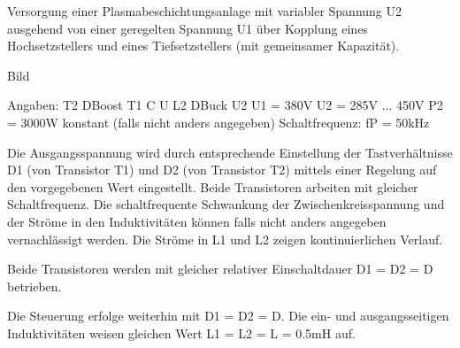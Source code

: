 

Versorgung einer Plasmabeschichtungsanlage mit variabler Spannung U2 ausgehend von einer
geregelten Spannung U1 über Kopplung eines Hochsetzstellers und eines Tiefsetzstellers (mit
gemeinsamer Kapazität).


Bild


Angaben:
T2
DBoost
T1
C
U
L2
DBuck
U2
U1 = 380V
U2 = 285V ... 450V
P2 = 3000W konstant (falls nicht anders angegeben)
Schaltfrequenz: fP = 50kHz


Die Ausgangsspannung wird durch entsprechende Einstellung der Tastverhältnisse D1 (von Transistor
T1) und D2 (von Transistor T2) mittels einer Regelung auf den vorgegebenen Wert eingestellt. Beide
Transistoren arbeiten mit gleicher Schaltfrequenz. Die schaltfrequente Schwankung der
Zwischenkreisspannung und der Ströme in den Induktivitäten können falls nicht anders
angegeben vernachlässigt werden. Die Ströme in L1 und L2 zeigen kontinuierlichen Verlauf.

Beide Transistoren werden mit gleicher relativer Einschaltdauer D1 = D2 = D betrieben.





Die Steuerung erfolge weiterhin mit D1 = D2 = D. Die ein- und ausgangsseitigen Induktivitäten
weisen gleichen Wert L1 = L2 = L = 0.5mH auf.




